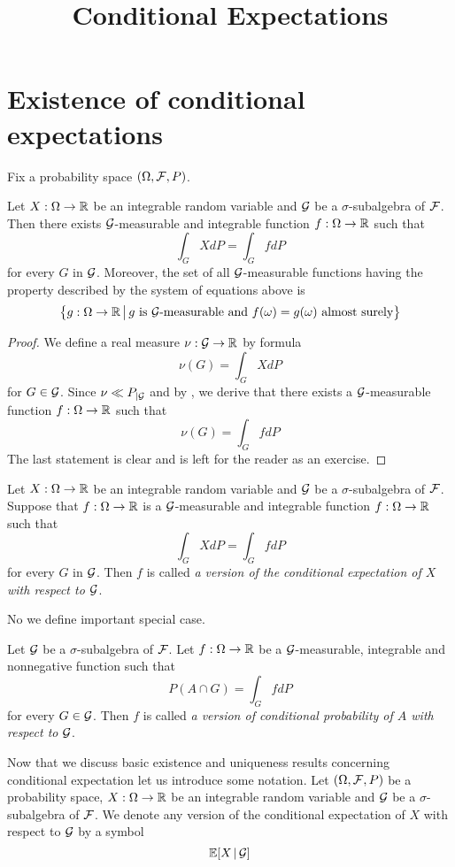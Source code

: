 



\title{Conditional Expectations}
\date{}
\maketitle

\section{Existence of conditional expectations}
\noindent
Fix a probability space $(\Omega, {\mathcal F}, P)$.

\begin{theorem}\label{theorem:existenceofconditionalexpectationforintegrable}
Let $X:\Omega \rightarrow {\mathbb R}$ be an integrable random variable and ${\mathcal G}$ be a $\sigma$-subalgebra of ${\mathcal F}$. Then there exists ${\mathcal G}$-measurable and integrable function $f:\Omega \rightarrow {\mathbb R}$ such that
$$\int_GXdP = \int_G f dP$$
for every $G$ in ${\mathcal G}$. Moreover, the set of all ${\mathcal G}$-measurable functions having the property described by the system of equations above is
$$\big\{g:\Omega \rightarrow {\mathbb R}\,\big|\,g\mbox{ is }{\mathcal G}\mbox{-measurable and }f(\omega)=g(\omega)\mbox{ almost surely}\big\}$$
\end{theorem}
\begin{proof}
We define a real measure $\nu:{\mathcal G}\rightarrow {\mathbb R}$ by formula
$$\nu(G) = \int_G XdP$$
for $G\in {\mathcal G}$. Since $\nu \ll P_{\mid {\mathcal G}}$ and by {\cite[Theorem 5.3]{RadonNikodymHahnJordanLebesguedecomposition}}, we derive that there exists a ${\mathcal G}$-measurable function $f:\Omega \rightarrow {\mathbb R}$ such that
$$\nu(G) = \int_G f dP$$
The last statement is clear and is left for the reader as an exercise.
\end{proof}

\begin{definition}
Let $X:\Omega \rightarrow {\mathbb R}$ be an integrable random variable and ${\mathcal G}$ be a $\sigma$-subalgebra of ${\mathcal F}$. Suppose that $f:\Omega \rightarrow {\mathbb R}$ is a ${\mathcal G}$-measurable and integrable function $f:\Omega \rightarrow {\mathbb R}$ such that 
$$\int_GXdP = \int_G f dP$$
for every $G$ in ${\mathcal G}$. Then $f$ is called \textit{a version of the conditional expectation of $X$ with respect to ${\mathcal G}$}.
\end{definition}
\noindent
No we define important special case.

\begin{definition}
Let ${\mathcal G}$ be a $\sigma$-subalgebra of ${\mathcal F}$. Let $f:\Omega \rightarrow {\mathbb R}$ be a ${\mathcal G}$-measurable, integrable and nonnegative function such that
$$P(A\cap G) = \int_G f dP$$
for every $G\in {\mathcal G}$. Then $f$ is called \textit{a version of conditional probability of $A$ with respect to ${\mathcal G}$}.
\end{definition}
\noindent
Now that we discuss basic existence and uniqueness results concerning conditional expectation let us introduce some notation. Let $(\Omega, {\mathcal F}, P)$ be a probability space, $X:\Omega \rightarrow {\mathbb R}$ be an integrable random variable and ${\mathcal G}$ be a $\sigma$-subalgebra of ${\mathcal F}$. We denote any version of the conditional expectation of $X$ with respect to ${\mathcal G}$ by a symbol
$$\mathbb{E}[X\,|\,{\mathcal G}]$$

